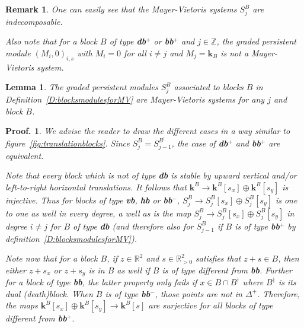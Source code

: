 \documentclass[a4paper, english, 11pt]{article}
\newcommand{\kk}[0]{\textbf{k}}
\newcommand{\0}{\vec{0}}
\newcommand{\R}[0]{\mathbb{R}}
\newcommand{\Z}[0]{\mathbb{Z}}
\newtheorem*{pf}{Proof.} }
\newtheorem{remark}[prop]{Remark}
\newtheorem{lem}[prop]{Lemma}
\begin{document}
\begin{remark}
One can easily see that the Mayer-Vietoris systems $S_j^B$ are indecomposable.

Also note that for a block $B$ of type \textbf{db}$^+$ or \textbf{bb}$^{+}$ and $j\in \Z$, the graded persistent module $(M_i,0)_{i,s}$ with $M_i = 0$ for all $i\not = j$ and $M_j = \kk_B$ is \emph{not} a Mayer-Vietoris system.
\end{remark}
\begin{lem} The graded persistent modules $S_j^{B}$ associated to blocks $B$ in Definition~\ref{D:blocksmodulesforMV} are Mayer-Vietoris systems for any $j$ and block $B$.
\end{lem}
\begin{pf} We advise the reader to draw the different cases in a way similar to figure~\ref{fig:translationblocks}. Since $S_j^B =S_{j-1}^{B^\dagger}$, the case of \textbf{db}$^+$ and \textbf{bb}$^+$ are equivalent.

\smallskip 

 Note that every block which is not of type  \textbf{db} is stable by upward vertical and/or left-to-right  horizontal translations. It follows that $\kk^B \to \kk^B[s_x] \oplus \kk^B[s_y]$ is injective. Thus for blocks of type \textbf{vb}, \textbf{hb} or \textbf{bb}$^{-}$,  $S^B_j \to S^B_j[s_x]\oplus S^B_j [s_y]$ is one to one as well in every degree, a well as is the map $S^B_j \to S^B_j[s_x]\oplus S^B_j [s_y]$ in degree $i\neq j$ for $B$ of type \textbf{db} (and therefore also for $S^B_{j-1}$ if $B$ is of type \textbf{bb}$^{+}$ by definition~\ref{D:blocksmodulesforMV}). 

 \smallskip
 
 Note now that for a block $B$, if $z \in \R^2$ and $s\in \R^2_{>0}$ satisfies that $z+s \in B$, then either  $z+s_x$ or $z+s_y$ is in $B$ as well if $B$ is of type different from \textbf{bb}. Further for a block of type \textbf{bb}, the latter property only fails if $x \in B\cap B^\dagger$ where $B^\dagger$ is its dual (death)block. When $B$ is of type \textbf{bb}$^{-}$, those points are not in $\Delta^+$.   
 Therefore, the maps $\kk^B[s_x]\oplus \kk^B[s_y]\to \kk^B[s]$ are surjective for all blocks of type different from \textbf{bb}$^{+}$. 
 
 \smallskip 
 

\end{pf}
\end{document}
